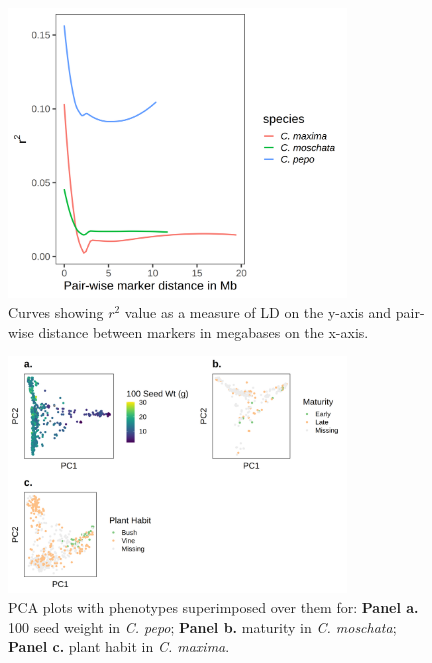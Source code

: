 \documentclass[utf8]{FrontiersinHarvard} %
\begin{document}
\clearpage

\begin{figure}[h]
	\begin{center}
		\includegraphics[width=0.8\textwidth]{../final_figures/06_fig.png}
	\end{center}
	\caption{Curves showing $r^{2}$ value as a measure of LD on the y-axis and pair-wise distance between markers in megabases on the x-axis. \label{fig:6}}
\end{figure}

\clearpage

\begin{figure}[h]
	\begin{center}
		\includegraphics[width=0.8\textwidth]{../final_figures/07_fig.png}
	\end{center}
	\caption{ PCA plots with phenotypes superimposed over them for: \textbf{Panel a.}  100 seed weight in \textit{C. pepo}; { \color{red} \textbf{Panel b.} }maturity in \textit{C. moschata}; \textbf{Panel c.} plant habit in \textit{C. maxima}.\label{fig:7}}
\end{figure}
\end{document}
